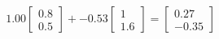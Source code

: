 \documentclass[preview]{standalone}
\begin{document}
\begin{align*}
1.00 \begin{bmatrix} 0.8 \\ 0.5 \end{bmatrix} + -0.53 \begin{bmatrix} 1 \\ 1.6 \end{bmatrix} = \begin{bmatrix} 0.27 \\ -0.35 \end{bmatrix}
\end{align*}
\end{document}
